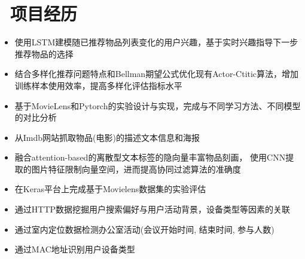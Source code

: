 \documentclass{resume}
\begin{document}
\section{\faUsers\ 项目经历}
\begin{onehalfspacing}
	\begin{itemize}
		\item 使用LSTM建模随已推荐物品列表变化的用户兴趣，基于实时兴趣指导下一步推荐物品的选择
		\item 结合多样化推荐问题特点和Bellman期望公式优化现有Actor-Ctitic算法，增加训练样本使用效率，提高多样化评估指标水平
		\item 基于MovieLens和Pytorch的实验设计与实现，完成与不同学习方法、不同模型的对比分析
	\end{itemize}
\end{onehalfspacing}
\begin{onehalfspacing}
\begin{itemize}
	\item 从Imdb网站抓取物品(电影)的描述文本信息和海报
	\item 融合attention-based的离散型文本标签的隐向量丰富物品刻画， 使用CNN提取的图片特征限制向量空间，进而提高协同过滤算法的准确度
	\item 在Keras平台上完成基于Movielens数据集的实验评估
\end{itemize}
\end{onehalfspacing}
\begin{onehalfspacing}
\begin{itemize}
  \item 通过HTTP数据挖掘用户搜索偏好与用户活动背景，设备类型等因素的关联
  \item 通过室内定位数据检测办公室活动(会议开始时间, 结束时间, 参与人数)
  \item 通过MAC地址识别用户设备类型
\end{itemize}
\end{onehalfspacing}
\end{document}
